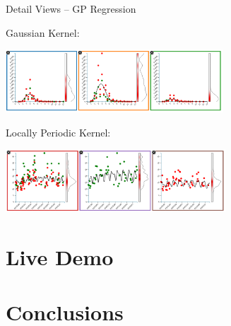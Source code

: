 \documentclass{beamer}
\begin{document}
\begin{frame}{Detail Views -- GP Regression}

  \begin{block}{Gaussian Kernel:}

  \centerline{
  \includegraphics[height=2.35cm]{./img/fview_gp_1.png}
  }

  \end{block}

  \begin{block}{Locally Periodic Kernel:}

  \centerline{
  \includegraphics[height=2.35cm]{./img/fview_gp_periodic_1.png}
  }

  \end{block}

\end{frame}

\section*{Live Demo}

\section{Conclusions}
\end{document}
